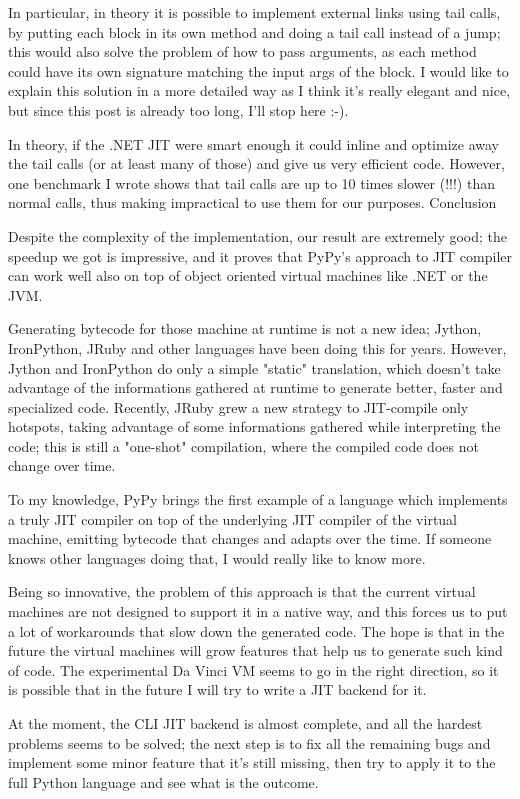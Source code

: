 {In particular, in theory it is possible to implement external links using tail calls, by putting each block in its own method and doing a tail call instead of a jump; this would also solve the problem of how to pass arguments, as each method could have its own signature matching the input args of the block. I would like to explain this solution in a more detailed way as I think it's really elegant and nice, but since this post is already too long, I'll stop here :-).

In theory, if the .NET JIT were smart enough it could inline and optimize away the tail calls (or at least many of those) and give us very efficient code. However, one benchmark I wrote shows that tail calls are up to 10 times slower (!!!) than normal calls, thus making impractical to use them for our purposes.
Conclusion

Despite the complexity of the implementation, our result are extremely good; the speedup we got is impressive, and it proves that PyPy's approach to JIT compiler can work well also on top of object oriented virtual machines like .NET or the JVM.

Generating bytecode for those machine at runtime is not a new idea; Jython, IronPython, JRuby and other languages have been doing this for years. However, Jython and IronPython do only a simple "static" translation, which doesn't take advantage of the informations gathered at runtime to generate better, faster and specialized code. Recently, JRuby grew a new strategy to JIT-compile only hotspots, taking advantage of some informations gathered while interpreting the code; this is still a "one-shot" compilation, where the compiled code does not change over time.

To my knowledge, PyPy brings the first example of a language which implements a truly JIT compiler on top of the underlying JIT compiler of the virtual machine, emitting bytecode that changes and adapts over the time. If someone knows other languages doing that, I would really like to know more.

Being so innovative, the problem of this approach is that the current virtual machines are not designed to support it in a native way, and this forces us to put a lot of workarounds that slow down the generated code. The hope is that in the future the virtual machines will grow features that help us to generate such kind of code. The experimental Da Vinci VM seems to go in the right direction, so it is possible that in the future I will try to write a JIT backend for it.

At the moment, the CLI JIT backend is almost complete, and all the hardest problems seems to be solved; the next step is to fix all the remaining bugs and implement some minor feature that it's still missing, then try to apply it to the full Python language and see what is the outcome.
}

